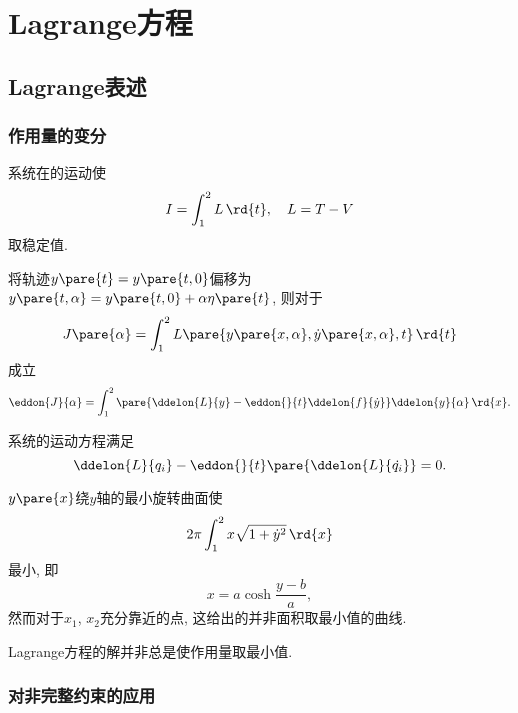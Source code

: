 \documentclass[../TheoreticalMechanics.tex]{subfiles}
\begin{document}
\section{Lagrange方程} %
\label{sec:lagrange方程}

\subsection{Lagrange表述} %
\label{sub:lagrange表述}

\subsubsection{作用量的变分} %
\label{ssub:作用量的变分}

\begin{axiom}[Hamilton原理]
	系统在的运动使
	\[ I = \int_1^2 L\,\rd{t},\quad L = T-V \]
	取稳定值.
\end{axiom}
\begin{lemma}[作用量的变分]
	将轨迹$y\pare{t} = y\pare{t,0}$偏移为$y\pare{t,\alpha} = y\pare{t,0} + \alpha \eta\pare{t}$, 则对于
	\[ J\pare{\alpha} = \int_1^2 L\pare{y\pare{x,\alpha},\dot{y}\pare{x,\alpha},t}\,\rd{t} \]
	成立
	\[ \eddon{J}{\alpha} = \int_1^2 \pare{\ddelon{L}{y} - \eddon{}{t}\ddelon{f}{\dot{y}}}\ddelon{y}{\alpha}\,\rd{x}. \]
\end{lemma}
\begin{finale}
	\begin{theorem}[Lagrange方程]
		系统的运动方程满足
		\[ \ddelon{L}{q_i} - \eddon{}{t}\pare{\ddelon{L}{\dot{q_i}}} = 0. \]
	\end{theorem}
\end{finale}
\begin{ex}
	$y\pare{x}$绕$y$轴的最小旋转曲面使
	\[ 2\pi \int_1^2 x\sqrt{1+\dot{y}^2}\,\rd{x} \]
	最小, 即
	\[ x = a\cosh \frac{y-b}{a}, \]
	然而对于$x_1$, $x_2$充分靠近的点, 这给出的并非面积取最小值的曲线.
\end{ex}
\begin{pitfall}
	Lagrange方程的解并非总是使作用量取最小值.
\end{pitfall}


\subsubsection{对非完整约束的应用} %
\label{ssub:对非完整约束的应用}
\end{document}
